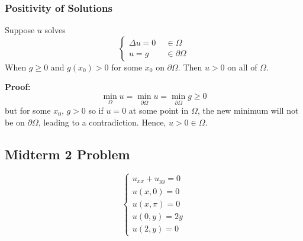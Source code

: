 \documentclass[10pt]{article}
\begin{document}
\subsubsection{Positivity of Solutions}
Suppose $u$ solves 
\[\begin{cases}
    \Delta u = 0\quad\, \in \Omega\\
    u = g \qquad \in \partial \Omega
\end{cases}\]
When $g \geq 0$ and $g(x_0) > 0$ for some $x_0$ on $\partial \Omega$. Then $u > 0$ on all of $\Omega$.

\textbf{Proof:}
\[\min_{\Omega} u = \min_{\partial \Omega} u = \min_{\partial \Omega} g \geq 0\]
but for some $x_0$, $g > 0$ so if $u = 0$ at some point in $\Omega$, the new minimum will not be on $\partial \Omega$, leading to a contradiction. Hence, $u > 0 \in \Omega$. 

\subsection{Midterm 2 Problem}
\[\begin{cases}
    u_{xx} + u_{yy} = 0\\
    u(x, 0) = 0\\
    u(x, \pi) = 0\\
    u(0, y) = 2y\\
    u(2, y) = 0
\end{cases}\]
\end{document}
